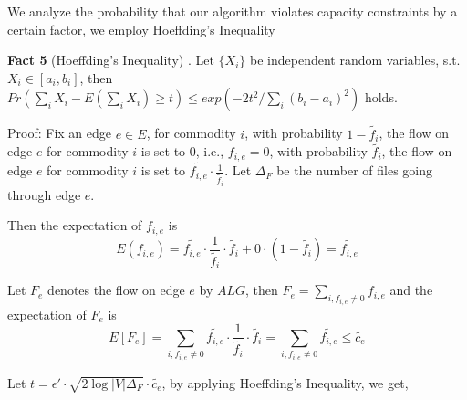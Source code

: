 \documentclass[onecolumn,11pt,journal, compsoc]{IEEEtran}
\begin{document}
We analyze the probability that our algorithm violates capacity constraints by a certain factor, we employ Hoeffding's Inequality 

\textbf{Fact 5} (Hoeffding's Inequality)\cite{Devdatt} . Let $\{X_i\}$ be independent random variables, s.t. $X_i \in [a_i, b_i]$, then $Pr(\sum_{i}X_i - E(\sum_{i}X_i ) \ge t) \le exp(-2t^2 / \sum_{i}(b_i-a_i)^2 )$ holds.

Proof: Fix an edge $e \in E$, for commodity $i$, with probability $1-\tilde{f_i}$, the flow on edge $e$ for commodity $i$ is set to 0, i.e., $f_{i,e}=0$, with probability $\tilde{f_i}$, the flow on edge $e$ for commodity $i$ is set to $\tilde{f_{i,e}} \cdot \frac{1}{\tilde{f_i}}$. Let $\Delta_F$ be the number of files going through edge $e$. 

Then the expectation of $f_{i,e}$ is 
\begin{equation}
E(f_{i,e}) = \tilde{f_{i,e}} \cdot \frac{1}{\tilde{f_i}} \cdot  \tilde{f_i}+ 0 \cdot (1-\tilde{f_i}) = \tilde{f_{i,e}}
\end{equation}

Let $F_e$ denotes the flow on edge $e$ by $ALG$, then $F_e = \sum_{i, f_{i,e} \neq 0}{f_{i,e}}$ and the expectation of $F_e$ is 
\begin{equation} \label{expect}
E[F_e] = \sum_{i, f_{i,e} \neq 0}\tilde{f_{i,e}} \cdot \frac{1}{\tilde{f_i}} \cdot  \tilde{f_i} = \sum_{i, f_{i,e} \neq 0}\tilde{f_{i,e}} \le \tilde{c_e}
\end{equation}



Let $t=\epsilon' \cdot \sqrt{2\log|V|\Delta_F} \cdot \tilde{c_e}$, by applying Hoeffding's Inequality, we get,
	
\end{document}
